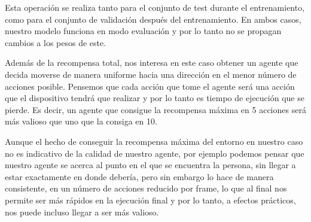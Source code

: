 Esta operación se realiza tanto para el conjunto de test durante el entrenamiento, como para el conjunto de validación después del entrenamiento. En ambos casos, nuestro modelo funciona en modo evaluación y por lo tanto no se propagan cambios a los pesos de este.
\medskip

Además de la recompensa total, nos interesa en este caso obtener un agente que decida moverse de manera uniforme hacia una dirección en el menor número de acciones posible. Pensemos que cada acción que tome el agente será una acción que el dispositivo tendrá que realizar y por lo tanto es tiempo de ejecución que se pierde. Es decir, un agente que consigue la recompensa máxima en 5 acciones será más valioso que uno que la consiga en 10.
\medskip

Aunque el hecho de conseguir la recompensa máxima del entorno en nuestro caso no es indicativo de la calidad de nuestro agente, por ejemplo podemos pensar que nuestro agente se acerca al punto en el que se encuentra la persona, sin llegar a estar exactamente en donde debería, pero sin embargo lo hace de manera consistente, en un número de acciones reducido por frame, lo que al final nos permite ser más rápidos en la ejecución final y por lo tanto, a efectos prácticos, nos puede incluso llegar a ser más valioso.
\medskip

